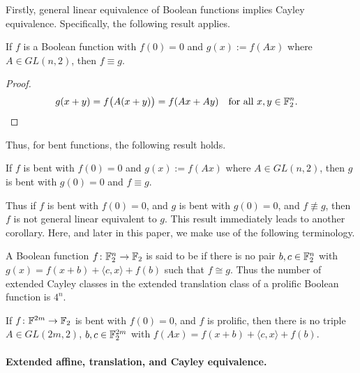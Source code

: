 Firstly, general linear equivalence of Boolean functions implies Cayley equivalence.
Specifically, the following result applies.
\begin{Theorem}
\label{th-Linear-Cayley}
If $f$ is a Boolean function with $f(0)=0$ and $g(x) := f(A x)$ where $A \in GL(n,2)$,
then $f \equiv g$.
\end{Theorem}
\begin{proof}
\begin{align*}
g(x+y) &= f\big(A(x+y)\big) = f(A x + A y)\quad \text{for all~} x,y \in \mathbb{F}_2^n.
\end{align*}
\end{proof}
Thus, for bent functions, the following result holds.
\begin{Corollary}
\label{corr-bent-Linear-Cayley}
If $f$ is bent with $f(0)=0$ and $g(x) := f(A x)$ where $A \in GL(n,2)$,
then $g$ is bent with $g(0)=0$ and $f \equiv g$.
\end{Corollary}
Thus if $f$ is bent with $f(0)=0$, and $g$ is bent with $g(0)=0$, and $f \not\equiv g$,
then $f$ is not general linear equivalent to $g$.
This result immediately leads to another corollary.
Here, and later in this paper, we make use of the following terminology.
\begin{Definition}
A Boolean function $f \colon \mathbb{F}_2^n \rightarrow \mathbb{F}_2$ is said to be  if
there is no pair $b, c \in \mathbb{F}_2^n$ with $g(x) = f(x+b) + \langle c, x \rangle + f(b)$ such that $f \cong g$.
Thus the number of extended Cayley classes in the extended translation class of a prolific Boolean function
is $4^n$.
\end{Definition}

\begin{Corollary}
 \label{corr-no-Cayley-no-Linear}
If $f \colon \mathbb{F}^{2m} \rightarrow \mathbb{F}_2$ is bent with $f(0)=0$, and $f$ is prolific, then there is no triple
$A \in GL(2m,2)$, $b, c \in \mathbb{F}_2^{2m}$ with $f(Ax) = f(x+b) + \langle c, x \rangle + f(b)$.
\end{Corollary}


\paragraph*{Extended affine, translation, and Cayley equivalence.}

